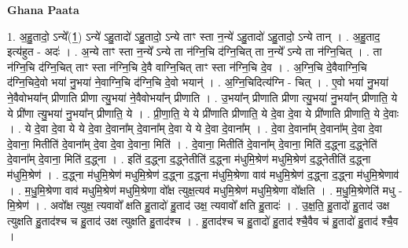 \documentclass[17pt]{extarticle}
\begin{document}
\textbf{Ghana Paata } \newline

1. अ॒हु॒तादो॒ ऽन्ये᳚(1॒) ऽन्ये॑ ऽहु॒तादो॑ ऽहु॒तादो॒ ऽन्ये ताꣳ स्ता न॒न्ये॑ ऽहु॒तादो॑ ऽहु॒तादो॒ ऽन्ये तान् । . अ॒हु॒ताद॒ इत्य॑हुत - अदः॑ । . अ॒न्ये ताꣳ स्ता न॒न्ये᳚ ऽन्ये ता न॑ग्नि॒चि द॑ग्नि॒चित् ता न॒न्ये᳚ ऽन्ये ता न॑ग्नि॒चित् । . ता न॑ग्नि॒चि द॑ग्नि॒चित् ताꣳ स्ता न॑ग्नि॒चि दे॒वै वाग्नि॒चित् ताꣳ स्ता न॑ग्नि॒चि दे॒व । . अ॒ग्नि॒चि दे॒वैवाग्नि॒चि द॑ग्नि॒चिदे॒वो भया॑ नु॒भया॑ ने॒वाग्नि॒चि द॑ग्नि॒चि दे॒वो भयान्॑ । . अ॒ग्नि॒चिदित्य॑ग्नि - चित् । . ए॒वो भया॑ नु॒भया॑ ने॒वैवोभया᳚न् प्रीणाति प्रीणा त्यु॒भया॑ ने॒वैवोभया᳚न् प्रीणाति । . उ॒भया᳚न् प्रीणाति प्रीणा त्यु॒भया॑ नु॒भया᳚न् प्रीणाति॒ ये ये प्री॑णा त्यु॒भया॑ नु॒भया᳚न् प्रीणाति॒ ये । . प्री॒णा॒ति॒ ये ये प्री॑णाति प्रीणाति॒ ये दे॒वा दे॒वा ये प्री॑णाति प्रीणाति॒ ये दे॒वाः । . ये दे॒वा दे॒वा ये ये दे॒वा दे॒वाना᳚म् दे॒वाना᳚म् दे॒वा ये ये दे॒वा दे॒वाना᳚म् । . दे॒वा दे॒वाना᳚म् दे॒वाना᳚म् दे॒वा दे॒वा दे॒वाना॒ मितीति॑ दे॒वाना᳚म् दे॒वा दे॒वा दे॒वाना॒ मिति॑ । . दे॒वाना॒ मितीति॑ दे॒वाना᳚म् दे॒वाना॒ मिति॑ द॒द्ध्ना द॒द्ध्नेति॑ दे॒वाना᳚म् दे॒वाना॒ मिति॑ द॒द्ध्ना । . इति॑ द॒द्ध्ना द॒द्ध्नेतीति॑ द॒द्ध्ना म॑धुमि॒श्रेण॑ मधुमि॒श्रेण॑ द॒द्ध्नेतीति॑ द॒द्ध्ना म॑धुमि॒श्रेण॑ । . द॒द्ध्ना म॑धुमि॒श्रेण॑ मधुमि॒श्रेण॑ द॒द्ध्ना द॒द्ध्ना म॑धुमि॒श्रेणा वाव॑ मधुमि॒श्रेण॑ द॒द्ध्ना द॒द्ध्ना म॑धुमि॒श्रेणाव॑ । . म॒धु॒मि॒श्रेणा वाव॑ मधुमि॒श्रेण॑ मधुमि॒श्रेणा वो᳚क्ष त्युक्ष॒त्यव॑ मधुमि॒श्रेण॑ मधुमि॒श्रेणा
वो᳚क्षति । . म॒धु॒मि॒श्रेणेति॑ मधु - मि॒श्रेण॑ । . अवो᳚क्ष त्युक्ष॒ त्यवावो᳚ क्षति हु॒तादो॑ हु॒ताद॑ उक्ष॒ त्यवावो᳚ क्षति हु॒तादः॑ । . उ॒क्ष॒ति॒ हु॒तादो॑ हु॒ताद॑ उक्ष त्युक्षति हु॒ताद॑श्च च हु॒ताद॑ उक्ष त्युक्षति हु॒ताद॑श्च । . हु॒ताद॑श्च च हु॒तादो॑ हु॒ताद॑ श्चै॒वैव च॑ हु॒तादो॑ हु॒ताद॑ श्चै॒व । \newline
\end{document}

